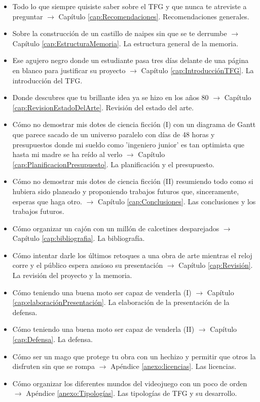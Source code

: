 \begin{itemize}
\item Todo lo que siempre quisiste saber sobre el TFG y que nunca te atreviste a preguntar $\rightarrow$ Capítulo \ref{cap:Recomendaciones}. Recomendaciones generales.
\item Sobre la construcción de un castillo de naipes sin que se te derrumbe $\rightarrow$ Capítulo \ref{cap:EstructuraMemoria}. La estructura general de la memoria.
\item Ese agujero negro donde un estudiante pasa tres días delante de una página en blanco para justificar su proyecto $\rightarrow$ Capítulo \ref{cap:IntroducciónTFG}. La introducción del TFG.
\item Donde descubres que tu brillante idea ya se hizo en los años 80 $\rightarrow$ Capítulo \ref{cap:RevisionEstadoDelArte}. Revisión del estado del arte.
\item Cómo no demostrar mis dotes de ciencia ficción (I) con un diagrama de Gantt que parece sacado de un universo paralelo con días de 48 horas y presupuestos donde mi sueldo como 'ingeniero junior' es tan optimista que hasta mi madre se ha reído al verlo $\rightarrow$ Capítulo \ref{cap:PlanificacionPresupuesto}. La planificación y el presupuesto.
\item Cómo no demostrar mis dotes de ciencia ficción (II) resumiendo todo como si hubiera sido planeado y proponiendo trabajos futuros que, sinceramente, esperas que haga otro. $\rightarrow$ Capítulo \ref{cap:Conclusiones}. Las conclusiones y los trabajos futuros.
\item Cómo organizar un cajón con un millón de calcetines desparejados $\rightarrow$ Capítulo \ref{cap:bibliografia}. La bibliografía.
\item Cómo intentar darle los últimos retoques a una obra de arte mientras el reloj corre y el público espera ansioso su presentación $\rightarrow$ Capítulo \ref{cap:Revisión}. La revisión del proyecto y la memoria.
\item Cómo teniendo una buena moto ser capaz de venderla (I) $\rightarrow$ Capítulo \ref{cap:elaboraciónPresentación}. La elaboración de la presentación de la defensa.
\item Cómo teniendo una buena moto ser capaz de venderla (II) $\rightarrow$ Capítulo \ref{cap:Defensa}. La defensa. 
\item Cómo ser un mago que protege tu obra con un hechizo y permitir que otros la disfruten sin que se rompa $\rightarrow$ Apéndice \ref{anexo:licencias}. Las licencias. 
\item Cómo organizar los diferentes mundos del videojuego con un poco de orden $\rightarrow$ Apéndice \ref{anexo:Tipologías}. Las tipologías de TFG y su desarrollo. \end{itemize}


